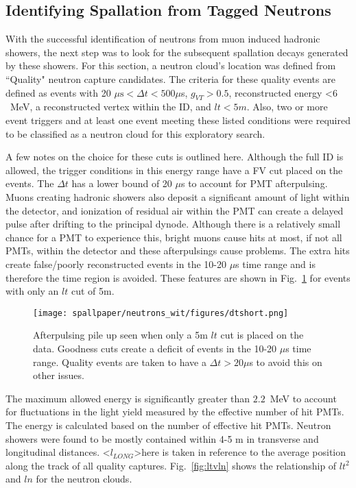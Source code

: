 \subsection{Identifying Spallation from Tagged Neutrons}
\label{sec:hadronic_spall}
With the successful identification of neutrons from muon induced hadronic showers, the next step was to look for the subsequent spallation decays generated by these showers. For this section, a neutron cloud's location was defined from ``Quality" neutron capture candidates. The criteria for these quality events are defined as events with 20 $\mu\mbox{s}< \Delta t < 500 \mu$s, $g_{VT} > 0.5$, reconstructed energy \textless $6$~MeV, a reconstructed vertex within the ID, and $lt < 5m$. Also, two or more event triggers and at least one event meeting these listed conditions were required to be classified as a neutron cloud for this exploratory search. 

A few notes on the choice for these cuts is outlined here. Although the full ID is allowed, the trigger conditions in this energy range have a FV cut placed on the events. The $\Delta t$ has a lower bound of 20 $\mu$s to account for PMT afterpulsing. Muons creating hadronic showers also deposit a significant amount of light within the detector, and ionization of residual air within the PMT can create a delayed pulse after drifting to the principal dynode. Although there is a relatively small chance for a PMT to experience this, bright muons cause hits at most, if not all PMTs, within the detector and these afterpulsings cause problems. The extra hits create false/poorly reconstructed events in the 10-20 $\mu$s time range and is therefore the time region is avoided. These features are shown in Fig.~\ref{fig:afterpulsing} for events with only an $lt$ cut of 5m.
\begin{figure}
    \centering
    \texttt{[image: spallpaper/neutrons\_wit/figures/dtshort.png]}
    \caption{Afterpulsing pile up seen when only a 5m $lt$ cut is placed on the data. Goodness cuts create a deficit of events in the 10-20 $\mu$s time range. Quality events are taken to have a $\Delta t > 20 \mu$s to avoid this on other issues.}
    \label{fig:afterpulsing}
\end{figure}

The maximum allowed energy is significantly greater than $2.2$~MeV to account for fluctuations in the light yield measured by the effective number of hit PMTs. The energy is calculated based on the number of effective hit PMTs. Neutron showers were found to be mostly contained within 4-5 m in transverse and longitudinal distances. \textless$l_{LONG}$\textgreater here is taken in reference to the average position along the track of all quality captures. Fig.~\ref{fig:ltvln} shows the relationship of $lt^2$ and $ln$ for the neutron clouds. 

